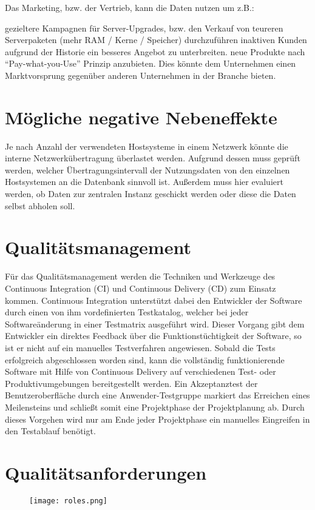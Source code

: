 Das Marketing, bzw. der Vertrieb, kann die Daten nutzen um z.B.:
\begin{outline}
  \1 gezieltere Kampagnen für Server-Upgrades, bzw. den Verkauf von teureren
  Serverpaketen (mehr RAM / Kerne / Speicher) durchzuführen
  \1 inaktiven Kunden aufgrund der Historie ein besseres Angebot zu
  unterbreiten.
  \1 neue Produkte nach “Pay-what-you-Use” Prinzip anzubieten. Dies könnte dem
  Unternehmen einen Marktvorsprung gegenüber anderen Unternehmen in der
  Branche bieten.
\end{outline}

\section{Mögliche negative Nebeneffekte}

Je nach Anzahl der verwendeten Hostsysteme in einem Netzwerk könnte die interne
Netzwerkübertragung überlastet werden. Aufgrund dessen muss geprüft werden,
welcher Übertragungsintervall der Nutzungsdaten von den einzelnen Hostsystemen
an die Datenbank sinnvoll ist. Außerdem muss hier evaluiert werden, ob Daten
zur zentralen Instanz geschickt werden oder diese die Daten selbst abholen
soll.

\section{Qualitätsmanagement}
Für das Qualitätsmanagement werden die Techniken und Werkzeuge des Continuous
Integration (CI) und Continuous Delivery (CD) zum Einsatz kommen. Continuous
Integration unterstützt dabei den Entwickler der Software durch einen von ihm
vordefinierten Testkatalog, welcher bei jeder Softwareänderung in einer
Testmatrix ausgeführt wird. Dieser Vorgang gibt dem Entwickler ein direktes
Feedback über die Funktionstüchtigkeit der Software, so ist er nicht auf ein
manuelles Testverfahren angewiesen. Sobald die Tests erfolgreich abgeschlossen
worden sind, kann die vollständig funktionierende Software mit Hilfe von
Continuous Delivery auf verschiedenen Test- oder Produktivumgebungen
bereitgestellt werden. Ein Akzeptanztest der Benutzeroberfläche durch eine
Anwender-Testgruppe markiert das Erreichen eines Meilensteins und schließt
somit eine Projektphase der Projektplanung ab. Durch dieses Vorgehen wird nur
am Ende jeder Projektphase ein manuelles Eingreifen in den Testablauf benötigt.


\section{Qualitätsanforderungen}

\begin{figure}[ht]
  \centering
  \texttt{[image: roles.png]}
\end{figure}

